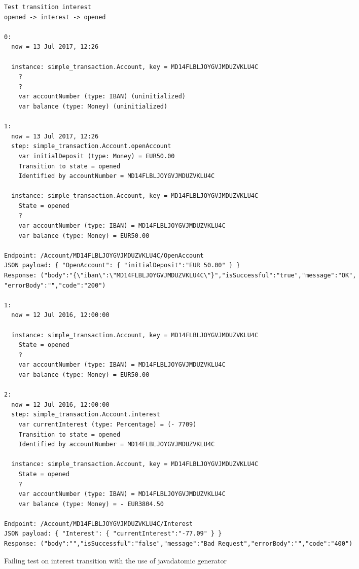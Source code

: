 \begin{sourcecode}[h!]
\begin{lstlisting}[]
Test transition interest
opened -> interest -> opened

0:
  now = 13 Jul 2017, 12:26

  instance: simple_transaction.Account, key = MD14FLBLJOYGVJMDUZVKLU4C 
    ?
    ?
    var accountNumber (type: IBAN) (uninitialized) 
    var balance (type: Money) (uninitialized)   

1:
  now = 13 Jul 2017, 12:26
  step: simple_transaction.Account.openAccount 
    var initialDeposit (type: Money) = EUR50.00 
    Transition to state = opened 
    Identified by accountNumber = MD14FLBLJOYGVJMDUZVKLU4C 

  instance: simple_transaction.Account, key = MD14FLBLJOYGVJMDUZVKLU4C 
    State = opened
    ?
    var accountNumber (type: IBAN) = MD14FLBLJOYGVJMDUZVKLU4C 
    var balance (type: Money) = EUR50.00   

Endpoint: /Account/MD14FLBLJOYGVJMDUZVKLU4C/OpenAccount
JSON payload: { "OpenAccount": { "initialDeposit":"EUR 50.00" } }
Response: ("body":"{\"iban\":\"MD14FLBLJOYGVJMDUZVKLU4C\"}","isSuccessful":"true","message":"OK",
"errorBody":"","code":"200")

1:
  now = 12 Jul 2016, 12:00:00

  instance: simple_transaction.Account, key = MD14FLBLJOYGVJMDUZVKLU4C 
    State = opened
    ?
    var accountNumber (type: IBAN) = MD14FLBLJOYGVJMDUZVKLU4C 
    var balance (type: Money) = EUR50.00   

2:
  now = 12 Jul 2016, 12:00:00
  step: simple_transaction.Account.interest 
    var currentInterest (type: Percentage) = (- 7709) 
    Transition to state = opened 
    Identified by accountNumber = MD14FLBLJOYGVJMDUZVKLU4C 

  instance: simple_transaction.Account, key = MD14FLBLJOYGVJMDUZVKLU4C 
    State = opened
    ?
    var accountNumber (type: IBAN) = MD14FLBLJOYGVJMDUZVKLU4C 
    var balance (type: Money) = - EUR3804.50   

Endpoint: /Account/MD14FLBLJOYGVJMDUZVKLU4C/Interest
JSON payload: { "Interest": { "currentInterest":"-77.09" } }
Response: ("body":"","isSuccessful":"false","message":"Bad Request","errorBody":"","code":"400")
\end{lstlisting}
\caption{Failing test on interest transition with the use of javadatomic generator}
\label{fig:result-javadatomic-interest}
\end{sourcecode}

